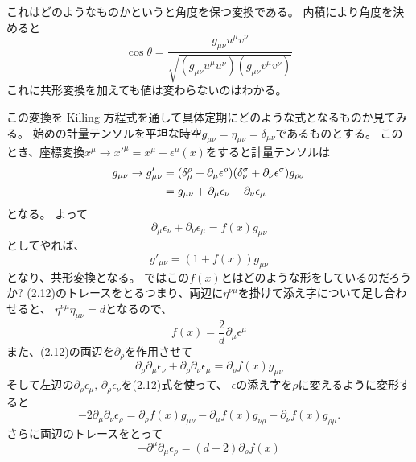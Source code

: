 \documentclass[../../master.tex]{subfiles}
\begin{document}
これはどのようなものかというと角度を保つ変換である。
内積により角度を決めると
\begin{equation*}
    \cos\theta = \frac{g_{\mu\nu}u^\mu v^\nu}{\sqrt{(g_{\mu\nu}u^\mu u^\nu)(g_{\mu\nu}v^\mu v^\nu)}}
\end{equation*}
これに共形変換を加えても値は変わらないのはわかる。

この変換を Killing 方程式を通して具体定期にどのような式となるものか見てみる。
始めの計量テンソルを平坦な時空\(g_{\mu\nu}=\eta_{\mu\nu}=\delta_{\mu\nu}\)であるものとする。
このとき、座標変換\(x^\mu\rightarrow x'^\mu = x^\mu - \epsilon^\mu(x)\)をすると計量テンソルは
\begin{align*}
    g_{\mu\nu}\rightarrow g'_{\mu\nu}
    &=(\delta_\mu^\rho+\partial_\mu\epsilon^\rho)(\delta_\nu^\sigma+\partial_\nu\epsilon^\sigma)g_{\rho\sigma}\notag\\
    &=g_{\mu\nu} + \partial_\mu\epsilon_\nu + \partial_\nu\epsilon_\mu
\end{align*}
となる。
よって
\begin{equation}
    \partial_\mu\epsilon_\nu + \partial_\nu\epsilon_\mu = f(x)g_{\mu\nu}
\end{equation}
としてやれば、
\begin{equation*}
    g'_{\mu\nu} = (1+f(x))g_{\mu\nu}
\end{equation*}
となり、共形変換となる。
ではこの\(f(x)\)とはどのような形をしているのだろうか?
(2.12)のトレースをとるつまり、両辺に\(\eta^{\nu\mu}\)を掛けて添え字について足し合わせると、
\(\eta^{\nu\mu}\eta_{\mu\nu}=d\)となるので、
\begin{equation}
    f(x) = \frac{2}{d}\partial_\mu\epsilon^\mu
\end{equation}
また、(2.12)の両辺を\(\partial_\rho\)を作用させて
\begin{equation}
    \partial_\rho\partial_\mu\epsilon_\nu + \partial_\rho\partial_\nu\epsilon_\mu = \partial_\rho f(x)g_{\mu\nu}
\end{equation}
そして左辺の\(\partial_\rho\epsilon_\mu,\,\partial_\rho\epsilon_\nu\)を(2.12)式を使って、
\(\epsilon\)の添え字を\(\rho\)に変えるように変形すると
\begin{equation}
    -2\partial_\mu\partial_\nu\epsilon_\rho = \partial_\rho f(x)g_{\mu\nu} - \partial_\mu f(x)g_{\nu\rho} -\partial_\nu f(x)g_{\rho\mu}.
\end{equation}
さらに両辺のトレースをとって
\begin{equation}
    -\partial^\mu\partial_\mu \epsilon_\rho = (d-2)\partial_\rho f(x)
\end{equation}
\end{document}
